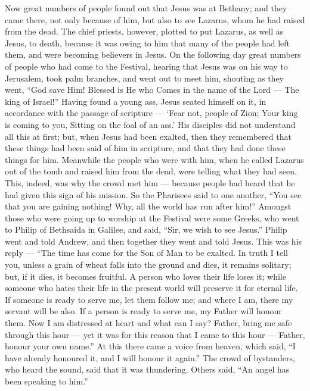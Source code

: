  Now great numbers of people found out that Jesus was at
Bethany; and they came there, not only because of him, but also to see
Lazarus, whom he had raised from the dead.  The chief
priests, however, plotted to put Lazarus, as well as Jesus, to death,
 because it was owing to him that many of the people had
left them, and were becoming believers in Jesus.  On the
following day great numbers of people who had come to the Festival,
hearing that Jesus was on his way to Jerusalem, took palm branches,
 and went out to meet him, shouting as they went, ``God
save Him! Blessed is He who Comes in the name of the Lord --- The king
of Israel!''  Having found a young ass, Jesus seated
himself on it, in accordance with the passage of scripture ---
 `Fear not, people of Zion; Your king is coming to you,
Sitting on the foal of an ass.'  His disciples did not
understand all this at first; but, when Jesus had been exalted, then
they remembered that these things had been said of him in scripture, and
that they had done these things for him.  Meanwhile the
people who were with him, when he called Lazarus out of the tomb and
raised him from the dead, were telling what they had seen. 
This, indeed, was why the crowd met him --- because people had heard
that he had given this sign of his mission.  So the
Pharisees said to one another, ``You see that you are gaining nothing!
Why, all the world has run after him!''  Amongst those who
were going up to worship at the Festival were some Greeks, 
who went to Philip of Bethsaida in Galilee, and said, ``Sir, we wish to
see Jesus.''  Philip went and told Andrew, and then
together they went and told Jesus.  This was his reply ---
``The time has come for the Son of Man to be exalted.  In
truth I tell you, unless a grain of wheat falls into the ground and
dies, it remains solitary; but, if it dies, it becomes fruitful.
 A person who loves their life loses it; while someone who
hates their life in the present world will preserve it for eternal life.
 If someone is ready to serve me, let them follow me; and
where I am, there my servant will be also. If a person is ready to serve
me, my Father will honour them.  Now I am distressed at
heart and what can I say? Father, bring me safe through this hour ---
yet it was for this reason that I came to this hour --- 
Father, honour your own name.'' At this there came a voice from heaven,
which said, ``I have already honoured it, and I will honour it again.''
 The crowd of bystanders, who heard the sound, said that it
was thundering. Others said, ``An angel has been speaking to him.''

